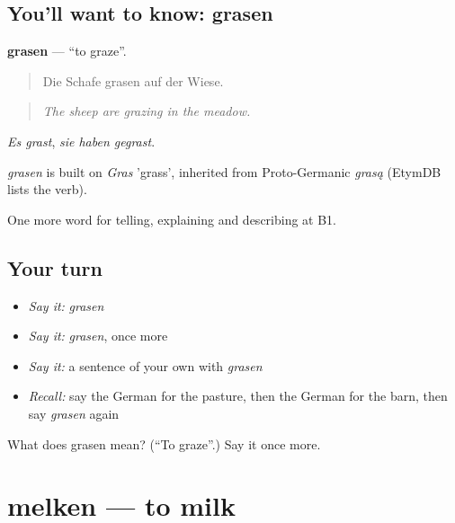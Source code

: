 \subsection*{You'll want to know: grasen}
\textbf{grasen} — \textquotedblleft{}to graze\textquotedblright{}.

\begin{quote}
Die Schafe grasen auf der Wiese.
\end{quote}

\begin{quote}
\emph{The sheep are grazing in the meadow.}
\end{quote}

\emph{Es grast}, \emph{sie haben gegrast}.

\begin{cousinweb}
\emph{grasen} is built on \emph{Gras} 'grass', inherited from Proto-Germanic \emph{grasą} (EtymDB lists the verb).
\end{cousinweb}

\begin{grammarlens}[title={What you've built}]
One more word for telling, explaining and describing at B1.
\end{grammarlens}

\subsection*{Your turn}
\begin{itemize}
\raggedright
  \item \emph{Say it:} \emph{grasen}
  \item \emph{Say it:} \emph{grasen}, once more
  \item \emph{Say it:} a sentence of your own with \emph{grasen}
  \item \emph{Recall:} say the German for the pasture, then the German for the barn, then say \emph{grasen} again
\end{itemize}

\begin{tcolorbox}[breakable,colback=teal!4,colframe=teal!35!black,title={Before you move on}]
What does grasen mean? (\textquotedblleft{}To graze\textquotedblright{}.) Say it once more.
\end{tcolorbox}
\section[melken]{melken — to milk}

\label{lesson:GE-C459-melken}



